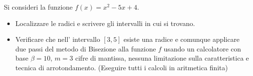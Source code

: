 Si consideri la funzione $f(x)=x^2-5x+4$.
\begin{itemize}
\item  Localizzare le radici e
scrivere gli intervalli in cui si trovano.
\item Verificare che nell' intervallo $[3,5]$ esiste una radice e comunque applicare due passi del
metodo di Bisezione alla funzione $f$ usando un calcolatore con
base $\beta =10$, $m=3$ cifre di mantissa, nessuna limitazione
sulla caratteristica e tecnica di arrotondamento. (Eseguire tutti
i calcoli in aritmetica finita)
\end{itemize}
